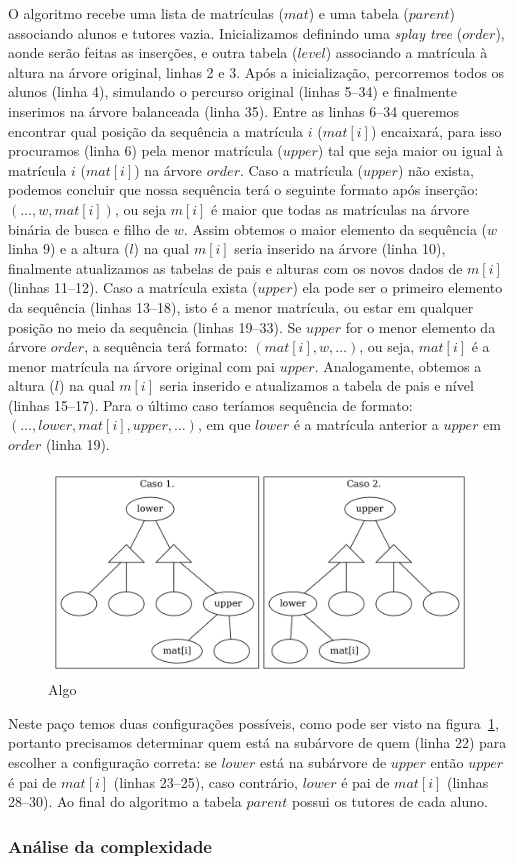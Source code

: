 O algoritmo recebe uma lista de matrículas ($mat$) e uma tabela ($parent$) associando alunos e
tutores vazia. Inicializamos definindo uma \textit{splay tree} ($order$), aonde
serão feitas as inserções, e outra tabela ($level$) associando a matrícula à
altura na árvore original, linhas 2 e 3. Após a inicialização, percorremos todos
os alunos (linha 4), simulando o percurso original (linhas 5--34) e finalmente
inserimos na árvore balanceada (linha 35). Entre as linhas 6--34 queremos
encontrar qual posição da sequência a matrícula $i$ ($mat[i]$) encaixará,
para isso procuramos (linha 6) pela menor matrícula ($upper$) tal que seja maior
ou igual à matrícula $i$ ($mat[i]$) na árvore $order$. Caso a matrícula ($upper$) não
exista, podemos concluir que nossa sequência terá o seguinte formato após inserção: $(\ldots,
w,mat[i])$, ou seja $m[i]$ é maior que todas as matrículas na árvore binária de
busca e filho de $w$. Assim obtemos o maior elemento da sequência ($w$ linha
9) e a altura ($l$) na qual $m[i]$ seria inserido na árvore (linha 10),
finalmente atualizamos as tabelas de pais e alturas com os novos dados de $m[i]$
(linhas 11--12). Caso a matrícula exista ($upper$) ela pode ser o primeiro
elemento da sequência (linhas 13--18), isto é a menor matrícula, ou estar em qualquer posição no
meio da sequência (linhas 19--33). Se $upper$ for o menor elemento da árvore
$order$, a sequência terá formato: $(mat[i], w, \ldots)$, ou seja, $mat[i]$ é a
menor matrícula na árvore original com pai $upper$. Analogamente, obtemos a altura ($l$) na qual
$m[i]$ seria inserido e atualizamos a tabela de pais e nível (linhas 15--17).
Para o último caso teríamos sequência de formato: $(\ldots, lower, mat[i],
upper, \ldots)$, em que $lower$ é a matrícula anterior a $upper$ em $order$
(linha 19).
\begin{figure}[!htb]
  \centering
  \includegraphics[width=0.7\linewidth]{lxu.png}
  \caption{Algo}
  \label{fig:lxu}
\end{figure}
Neste paço temos duas configurações possíveis, como pode ser visto
na figura~\ref{fig:lxu}, portanto precisamos determinar quem está na subárvore
de quem (linha 22) para escolher a configuração correta: se $lower$ está na
subárvore de $upper$ então $upper$ é pai de $mat[i]$ (linhas 23--25), caso
contrário, $lower$ é pai de $mat[i]$ (linhas 28--30). Ao final do algoritmo a
tabela $parent$ possui os tutores de cada aluno.

\subsubsection{Análise da complexidade}

